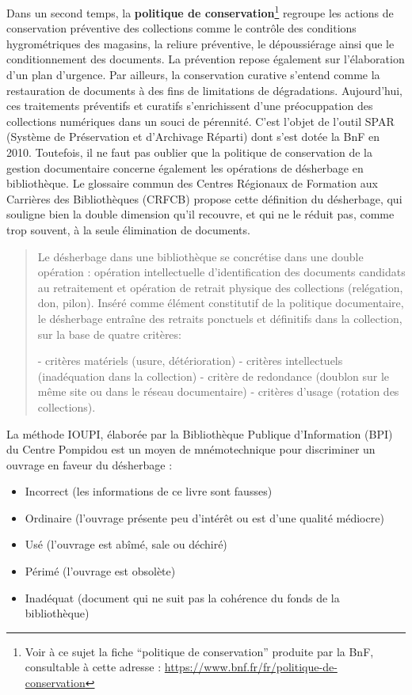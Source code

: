 Dans un second temps, la \textbf{politique de conservation}\footnote{Voir à ce sujet la fiche \enquote{politique de conservation} produite par la BnF, consultable à cette adresse : \url{https://www.bnf.fr/fr/politique-de-conservation}} regroupe les actions de conservation préventive des collections comme le contrôle des conditions hygrométriques des magasins, la reliure préventive, le dépoussiérage ainsi que le conditionnement des documents. La prévention repose également sur l'élaboration d'un plan d'urgence. Par ailleurs, la conservation curative s'entend comme la restauration de documents à des fins de limitations de dégradations. 
Aujourd'hui, ces traitements préventifs et curatifs s'enrichissent d'une préocuppation des collections numériques dans un souci de pérennité. C'est l'objet de l'outil SPAR (Système de Préservation et d'Archivage Réparti) dont s'est dotée la BnF en 2010. 
Toutefois, il ne faut pas oublier que la politique de conservation de la gestion documentaire concerne également les opérations de désherbage en bibliothèque. 
Le glossaire commun des Centres Régionaux de Formation aux Carrières des Bibliothèques (CRFCB) propose cette définition du désherbage, qui souligne bien la double dimension qu'il recouvre, et qui ne le réduit pas, comme trop souvent, à la seule élimination de documents. 
\begin{quotation}
	Le désherbage dans une bibliothèque se concrétise dans une double opération : opération intellectuelle d’identification des documents candidats au retraitement et opération de retrait physique des collections (relégation, don, pilon). Inséré comme élément constitutif de la politique documentaire, le désherbage entraîne des retraits ponctuels et définitifs dans la collection, sur la base de quatre critères:
	
	- critères matériels (usure, détérioration)
	- critères intellectuels (inadéquation dans la collection)
    - critère de redondance (doublon sur le même site ou dans le réseau documentaire)
 	- critères d’usage (rotation des collections).
\end{quotation}
La méthode IOUPI, élaborée par la Bibliothèque Publique d'Information (BPI) du Centre Pompidou est un moyen de mnémotechnique pour discriminer un ouvrage en faveur du désherbage : 
\begin{itemize}
	\item Incorrect (les informations de ce livre sont fausses)
	\item Ordinaire (l'ouvrage présente peu d'intérêt ou est d'une qualité médiocre)
	\item Usé (l'ouvrage est abîmé, sale ou déchiré)
	\item Périmé (l'ouvrage est obsolète)
	\item Inadéquat (document qui ne suit pas la cohérence du fonds de la bibliothèque)
\end{itemize}

